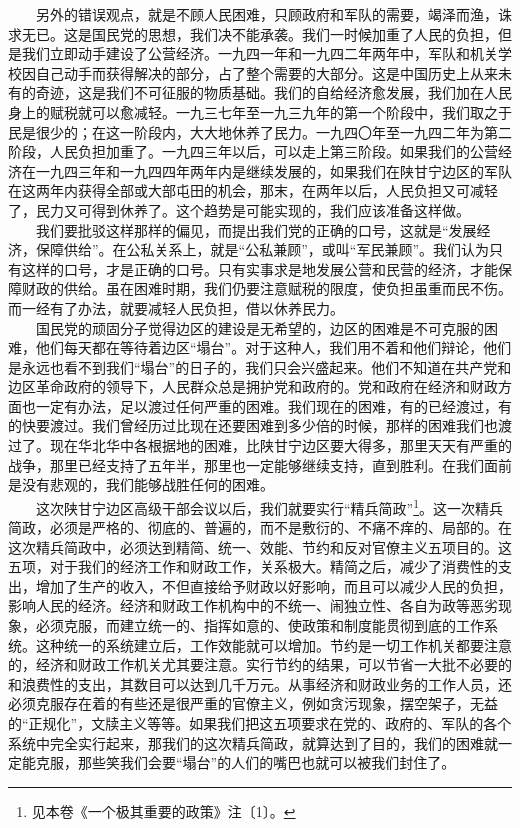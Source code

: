 \documentclass[cn,11pt,chinese]{elegantbook}
\begin{document}
　　另外的错误观点，就是不顾人民困难，只顾政府和军队的需要，竭泽而渔，诛求无已。这是国民党的思想，我们决不能承袭。我们一时候加重了人民的负担，但是我们立即动手建设了公营经济。一九四一年和一九四二年两年中，军队和机关学校因自己动手而获得解决的部分，占了整个需要的大部分。这是中国历史上从来未有的奇迹，这是我们不可征服的物质基础。我们的自给经济愈发展，我们加在人民身上的赋税就可以愈减轻。一九三七年至一九三九年的第一个阶段中，我们取之于民是很少的；在这一阶段内，大大地休养了民力。一九四〇年至一九四二年为第二阶段，人民负担加重了。一九四三年以后，可以走上第三阶段。如果我们的公营经济在一九四三年和一九四四年两年内是继续发展的，如果我们在陕甘宁边区的军队在这两年内获得全部或大部屯田的机会，那末，在两年以后，人民负担又可减轻了，民力又可得到休养了。这个趋势是可能实现的，我们应该准备这样做。\\
　　我们要批驳这样那样的偏见，而提出我们党的正确的口号，这就是“发展经济，保障供给”。在公私关系上，就是“公私兼顾”，或叫“军民兼顾”。我们认为只有这样的口号，才是正确的口号。只有实事求是地发展公营和民营的经济，才能保障财政的供给。虽在困难时期，我们仍要注意赋税的限度，使负担虽重而民不伤。而一经有了办法，就要减轻人民负担，借以休养民力。\\
　　国民党的顽固分子觉得边区的建设是无希望的，边区的困难是不可克服的困难，他们每天都在等待着边区“塌台”。对于这种人，我们用不着和他们辩论，他们是永远也看不到我们“塌台”的日子的，我们只会兴盛起来。他们不知道在共产党和边区革命政府的领导下，人民群众总是拥护党和政府的。党和政府在经济和财政方面也一定有办法，足以渡过任何严重的困难。我们现在的困难，有的已经渡过，有的快要渡过。我们曾经历过比现在还要困难到多少倍的时候，那样的困难我们也渡过了。现在华北华中各根据地的困难，比陕甘宁边区要大得多，那里天天有严重的战争，那里已经支持了五年半，那里也一定能够继续支持，直到胜利。在我们面前是没有悲观的，我们能够战胜任何的困难。\\
　　这次陕甘宁边区高级干部会议以后，我们就要实行“精兵简政”\footnote[3]{ 见本卷《一个极其重要的政策》注〔1〕。}。这一次精兵简政，必须是严格的、彻底的、普遍的，而不是敷衍的、不痛不痒的、局部的。在这次精兵简政中，必须达到精简、统一、效能、节约和反对官僚主义五项目的。这五项，对于我们的经济工作和财政工作，关系极大。精简之后，减少了消费性的支出，增加了生产的收入，不但直接给予财政以好影响，而且可以减少人民的负担，影响人民的经济。经济和财政工作机构中的不统一、闹独立性、各自为政等恶劣现象，必须克服，而建立统一的、指挥如意的、使政策和制度能贯彻到底的工作系统。这种统一的系统建立后，工作效能就可以增加。节约是一切工作机关都要注意的，经济和财政工作机关尤其要注意。实行节约的结果，可以节省一大批不必要的和浪费性的支出，其数目可以达到几千万元。从事经济和财政业务的工作人员，还必须克服存在着的有些还是很严重的官僚主义，例如贪污现象，摆空架子，无益的“正规化”，文牍主义等等。如果我们把这五项要求在党的、政府的、军队的各个系统中完全实行起来，那我们的这次精兵简政，就算达到了目的，我们的困难就一定能克服，那些笑我们会要“塌台”的人们的嘴巴也就可以被我们封住了。\\
\end{document}
